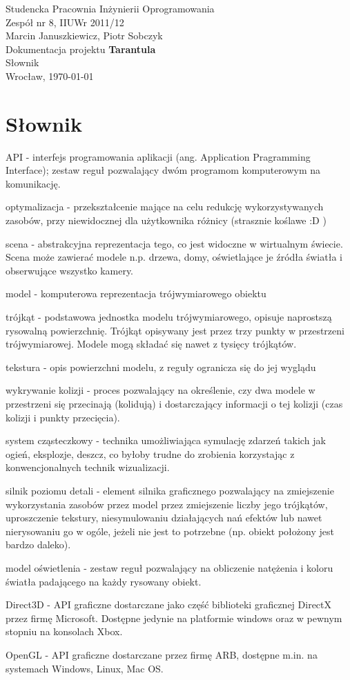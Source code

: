 \documentclass[11pt,leqno]{article}
\begin{document}
\begin{center}
\thispagestyle{empty}
{\Large Studencka Pracownia Inżynierii Oprogramowania}\\[0.5cm]
{\Large Zespół nr 8, IIUWr 2011/12}\\[2.5cm]

{Marcin Januszkiewicz, Piotr Sobczyk}\\[0.5cm]
{\huge Dokumentacja projektu \textbf{Tarantula}}\\[0.25cm]
{ Słownik}\\[0.5cm]
\vfill
{\large Wrocław, \today}
\end{center}

\newpage


\section{Słownik}

API - interfejs programowania aplikacji (ang. Application Pragramming Interface); zestaw reguł pozwalający dwóm programom komputerowym na komunikację.

optymalizacja - przekształcenie mające na celu redukcję wykorzystywanych zasobów, przy niewidocznej dla użytkownika różnicy (strasznie koślawe :D )

scena - abstrakcyjna reprezentacja tego, co jest widoczne w wirtualnym świecie. Scena może zawierać modele n.p. drzewa, domy, oświetlające je źródła światła i obserwujące wszystko kamery.

model - komputerowa reprezentacja trójwymiarowego obiektu

trójkąt - podstawowa jednostka modelu trójwymiarowego, opisuje naprostszą rysowalną powierzchnię. Trójkąt opisywany jest przez trzy punkty w przestrzeni trójwymiarowej. Modele mogą składać się nawet z tysięcy trójkątów.

tekstura - opis powierzchni modelu, z reguły ogranicza się do jej wyglądu

wykrywanie kolizji - proces pozwalający na określenie, czy dwa modele w przestrzeni się przecinają (kolidują) i dostarczający informacji o tej kolizji (czas kolizji i punkty przecięcia).

system cząsteczkowy - technika umożliwiająca symulację zdarzeń takich jak ogień, eksplozje, deszcz, co byłoby trudne do zrobienia korzystając z konwencjonalnych technik wizualizacji.

silnik poziomu detali - element silnika graficznego pozwalający na zmiejszenie wykorzystania zasobów przez model przez zmiejszenie liczby jego trójkątów, uproszczenie tekstury, niesymulowaniu działających nań efektów lub nawet nierysowaniu go w ogóle, jeżeli nie jest to potrzebne (np. obiekt położony jest bardzo daleko).

model oświetlenia - zestaw reguł pozwalający na obliczenie natężenia i koloru światła padającego na każdy rysowany obiekt.

Direct3D - API graficzne dostarczane jako część biblioteki graficznej DirectX przez firmę Microsoft. Dostępne jedynie na platformie windows oraz w pewnym stopniu na konsolach Xbox.

OpenGL - API graficzne dostarczane przez firmę ARB, dostępne m.in. na systemach Windows, Linux, Mac OS.
\end{document}
